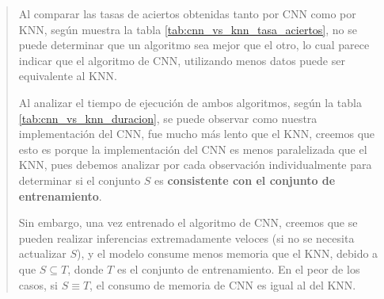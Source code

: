\documentclass{article}
\begin{document}
\begin{enumerate}
\begin{enumerate}
\begin{quote}
    Al comparar las tasas de aciertos obtenidas tanto por CNN como por KNN, según muestra la tabla \ref{tab:cnn_vs_knn_tasa_aciertos}, no se puede determinar que un algoritmo sea mejor que el otro, lo cual parece indicar que el algoritmo de CNN, utilizando menos datos puede ser equivalente al KNN.

    Al analizar el tiempo de ejecución de ambos algoritmos, según la tabla \ref{tab:cnn_vs_knn_duracion}, se puede observar como nuestra implementación del CNN, fue mucho más lento que el KNN, creemos que esto es porque la implementación del CNN es menos paralelizada que el KNN, pues debemos analizar por cada observación individualmente para determinar si el conjunto $S$ es \textbf{consistente con el conjunto de entrenamiento}. 
    
    Sin embargo, una vez entrenado el algoritmo de CNN, creemos que se pueden realizar inferencias extremadamente veloces (si no se necesita actualizar $S$), y el modelo consume menos memoria que el KNN, debido a que $S \subseteq T$, donde $T$ es el conjunto de entrenamiento. En el peor de los casos, si $S \equiv T$, el consumo de memoria de CNN es igual al del KNN.
\end{quote}


\end{enumerate}
\end{enumerate}
\end{document}
